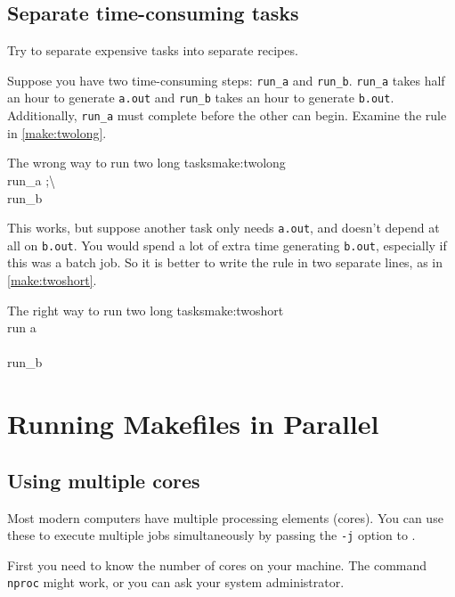 \subsection{Separate time-consuming tasks}

Try to separate expensive tasks into separate recipes. 

Suppose you have two time-consuming steps: \texttt{run_a} and \texttt{run_b}. \texttt{run_a} takes half an hour to generate \texttt{a.out} and \texttt{run_b} takes an hour to generate \texttt{b.out}. Additionally, \texttt{run_a} must complete before the other can begin. Examine the rule in \autoref{make:twolong}.
\begin{make}{The wrong way to run two long tasks}{make:twolong}
	 \\
	\tab run_a ;\textbackslash \\
	\tab run_b
\end{make}

This works, but suppose another task only needs \texttt{a.out}, and doesn't depend at all on \texttt{b.out}. You would spend a lot of extra time generating \texttt{b.out}, especially if this was a batch job. So it is better to write the rule in two separate lines, as in \autoref{make:twoshort}.

\begin{make}{The right way to run two long tasks}{make:twoshort}
	 \\
	\tab run a \\
	
	 \\
	\tab run_b
\end{make}

\section{Running Makefiles in Parallel}
\label{sec:gridengine}
\subsection{Using multiple cores}

Most modern computers have multiple processing elements (cores). You can use these to execute multiple jobs simultaneously by passing the \texttt{-j} option to \maken.

First you need to know the number of cores on your machine. The command \texttt{nproc} might work, or you can ask your system administrator.

